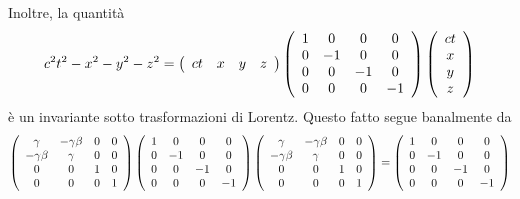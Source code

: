 \documentclass[a4paper,11pt]{book}
\theoremstyle{theorem}
\theoremstyle{definition}
\begin{document}
Inoltre, la quantità
\[c^2t^2-x^2-y^2-z^2=\left(\begin{array}{c c c c}
ct&x&y&z
\end{array}\right)\left(\begin{array}{c c c c}
1&0&0&0\\0&-1&0&0\\0&0&-1&0\\0&0&0&-1
\end{array}\right)\left(\begin{array}{c}
ct\\x\\y\\z
\end{array}\right)\]
è un invariante sotto trasformazioni di Lorentz. Questo fatto segue banalmente da
\[\left(\begin{array}{c c c c}
\gamma&-\gamma\beta&0&0\\-\gamma\beta&\gamma&0&0\\0&0&1&0\\0&0&0&1
\end{array}\right)\left(\begin{array}{c c c c}
1&0&0&0\\0&-1&0&0\\0&0&-1&0\\0&0&0&-1
\end{array}\right)\left(\begin{array}{c c c c}
\gamma&-\gamma\beta&0&0\\-\gamma\beta&\gamma&0&0\\0&0&1&0\\0&0&0&1
\end{array}\right)=\left(\begin{array}{c c c c}
1&0&0&0\\0&-1&0&0\\0&0&-1&0\\0&0&0&-1
\end{array}\right)\]
\end{document}
